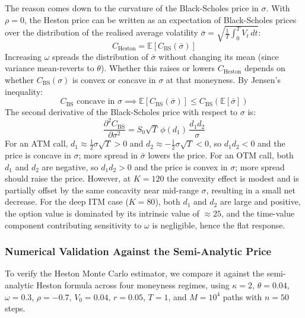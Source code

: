 \documentclass[a4paper,11pt, titlepage]{article}
\theoremstyle{definition}
\theoremstyle{plain}
\theoremstyle{remark}
\begin{document}
The reason comes down to the curvature of the Black-Scholes price in $\sigma$. With $\rho = 0$, the Heston price can be written as an expectation of Black-Scholes prices over the distribution of the realised average volatility $\bar{\sigma} = \sqrt{\frac{1}{T}\int_0^T V_t \, dt}$:
\begin{equation}
    C_{\text{Heston}} = \mathbb{E}\left[ C_{\text{BS}}\!\left(\bar{\sigma}\right) \right]
\end{equation}
Increasing $\omega$ spreads the distribution of $\bar{\sigma}$ without changing its mean (since variance mean-reverts to $\theta$). Whether this raises or lowers $C_{\text{Heston}}$ depends on whether $C_{\text{BS}}(\sigma)$ is convex or concave in $\sigma$ at that moneyness. By Jensen's inequality:
\begin{equation}
    C_{\text{BS}} \text{ concave in } \sigma \implies \mathbb{E}\left[C_{\text{BS}}(\bar{\sigma})\right] \leq C_{\text{BS}}\!\left(\mathbb{E}[\bar{\sigma}]\right)
\end{equation}
The second derivative of the Black-Scholes price with respect to $\sigma$ is:
\begin{equation}
    \frac{\partial^2 C_{\text{BS}}}{\partial \sigma^2} = S_0 \sqrt{T} \, \phi(d_1) \, \frac{d_1 d_2}{\sigma}
\end{equation}
For an ATM call, $d_1 \approx \tfrac{1}{2}\sigma\sqrt{T} > 0$ and $d_2 \approx -\tfrac{1}{2}\sigma\sqrt{T} < 0$, so $d_1 d_2 < 0$ and the price is concave in $\sigma$; more spread in $\bar{\sigma}$ lowers the price. For an OTM call, both $d_1$ and $d_2$ are negative, so $d_1 d_2 > 0$ and the price is convex in $\sigma$; more spread should raise the price. However, at $K=120$ the convexity effect is modest and is partially offset by the same concavity near mid-range $\sigma$, resulting in a small net decrease. For the deep ITM case ($K=80$), both $d_1$ and $d_2$ are large and positive, the option value is dominated by its intrinsic value of $\approx 25$, and the time-value component contributing sensitivity to $\omega$ is negligible, hence the flat response.

\FloatBarrier

\subsubsection{Numerical Validation Against the Semi-Analytic Price}

To verify the Heston Monte Carlo estimator, we compare it against the semi-analytic Heston formula across four moneyness regimes, using $\kappa=2$, $\theta=0.04$, $\omega=0.3$, $\rho=-0.7$, $V_0=0.04$, $r=0.05$, $T=1$, and $M=10^4$ paths with $n=50$ steps.
\end{document}
